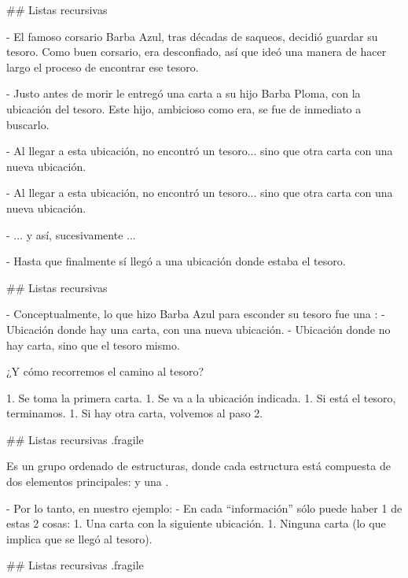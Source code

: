 ## Listas recursivas


- El famoso corsario Barba Azul, tras décadas de saqueos, decidió guardar
    su tesoro. Como buen corsario, era desconfiado, así que ideó una manera de
    hacer largo el proceso de encontrar ese tesoro.

- Justo antes de morir le entregó una carta a su hijo Barba Ploma, con la ubicación del tesoro.
    Este hijo, ambicioso como era, se fue de inmediato a buscarlo.

- Al llegar a esta ubicación, no encontró un tesoro... sino que otra carta con una nueva ubicación.

- Al llegar a esta ubicación, no encontró un tesoro... sino que otra carta con una nueva ubicación.

- ... y así, sucesivamente ...

- Hasta que finalmente sí llegó a una ubicación donde estaba el tesoro.

## Listas recursivas


- Conceptualmente, lo que hizo Barba Azul para esconder su tesoro fue una :
    -  Ubicación donde hay una carta, con una nueva ubicación.
    -  Ubicación donde no hay carta, sino que el tesoro mismo.

\vfill
\pause

\bgnblockgood
¿Y cómo recorremos el camino al tesoro?
\trmblockgood

1. Se toma la primera carta.
1. Se va a la ubicación indicada.
1. Si está el tesoro, terminamos.
1. Si hay otra carta, volvemos al paso 2.

## Listas recursivas {.fragile}

\bgnblockdefinition
{} Es un grupo ordenado de estructuras, donde cada estructura está compuesta de
dos elementos principales:  y una .
\trmblockdefinition

\pause

- Por lo tanto, en nuestro ejemplo:
    - En cada ``información'' sólo puede haber 1 de estas 2 cosas:
        1. Una carta con la siguiente ubicación.
        1. Ninguna carta (lo que implica que se llegó al tesoro).

## Listas recursivas {.fragile}

